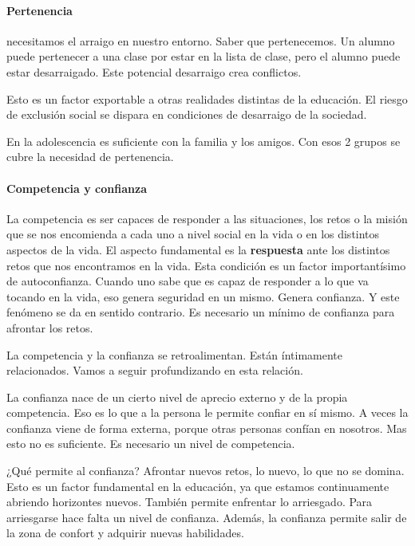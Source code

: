 \documentclass[palatino]{apuntesURJC}
\begin{document}
	\paragraph{Pertenencia} necesitamos el arraigo en nuestro entorno. Saber que pertenecemos. 
%
Un alumno puede pertenecer a una clase por estar en la lista de clase, pero el alumno puede estar desarraigado. 
%
Este potencial desarraigo crea conflictos.

Esto es un factor exportable a otras realidades distintas de la educación. 
%
El riesgo de exclusión social se dispara en condiciones de desarraigo de la sociedad.

En la adolescencia es suficiente con la familia y los amigos. 
%
Con esos 2 grupos se cubre la necesidad de pertenencia.

	\paragraph{Competencia y confianza} La competencia es ser capaces de responder a las situaciones, los retos o la misión que se nos encomienda a cada uno a nivel social en la vida o en los distintos aspectos de la vida. 
	El aspecto fundamental es la \textbf{respuesta} ante los distintos retos que nos encontramos en la vida.
	Esta condición es un factor importantísimo de autoconfianza. 
	Cuando uno sabe que es capaz de responder a lo que va tocando en la vida, eso genera seguridad en un mismo. Genera confianza.
	Y este fenómeno se da en sentido contrario.
	Es necesario un mínimo de confianza para afrontar los retos.


	La competencia y la confianza se retroalimentan. Están íntimamente relacionados.
	Vamos a seguir profundizando en esta relación.

	La confianza nace de un cierto nivel de aprecio externo y de la propia competencia. 
	Eso es lo que a la persona le permite confiar en sí mismo.
	A veces la confianza viene de forma externa, porque otras personas confían en nosotros. 
	Mas esto no es suficiente.
	Es necesario un nivel de competencia.

	¿Qué permite al confianza? Afrontar nuevos retos, lo nuevo, lo que no se domina. Esto es un factor fundamental en la educación, ya que estamos continuamente abriendo horizontes nuevos.
	También permite enfrentar lo arriesgado. Para arriesgarse hace falta un nivel de confianza.
	Además, la confianza permite salir de la zona de confort y adquirir nuevas habilidades.
\end{document}
